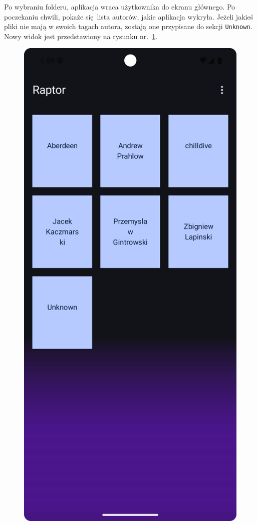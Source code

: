 Po wybraniu folderu, aplikacja wraca użytkownika do ekranu głównego. Po poczekaniu chwili, pokaże się lista autorów, jakie aplikacja wykryła. Jeżeli jakieś pliki nie mają w swoich tagach autora, zostają one przypisane do sekcji \texttt{Unknown}. Nowy widok jest przedstawiony na rysunku nr.~\ref{fig:tutorial_after_loading}.

\begin{figure}[H]
	\centering
	\includegraphics[width=1\textwidth]{images/tutorial_after_loading.png}
	\caption{}
	\label{fig:tutorial_after_loading}
\end{figure}

